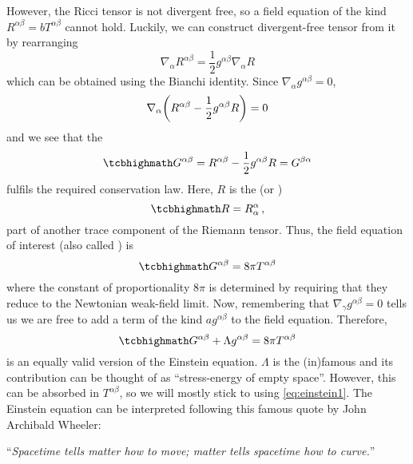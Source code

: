 However, the Ricci tensor is not divergent free, so a field equation of the kind $R^{\alpha \beta} = b T^{\alpha \beta}$ cannot hold. Luckily, we can construct divergent-free tensor from it by rearranging
\begin{equation*}
\nabla_\alpha R^{\alpha \beta} = \frac{1}{2} g^{\alpha \beta} \nabla_\alpha R
\end{equation*}
which can be obtained using the Bianchi identity. Since $\nabla_\alpha g^{\alpha \beta} = 0$,
\begin{equation}
\nabla_\alpha \qty(R^{\alpha \beta} - \frac{1}{2} g^{\alpha \beta} R) = 0
\end{equation}
and we see that the 
\begin{equation}
\eqbox{
G^{\alpha \beta} = R^{\alpha \beta} - \frac{1}{2} g^{\alpha \beta} R = G^{\beta \alpha}
}
\end{equation}
fulfils the required conservation law. Here, $R$ is the  (or )
\begin{equation}
\eqbox{
R = R^\alpha_\alpha
} \, ,
\end{equation}
part of another trace component of the Riemann tensor. Thus, the field equation of interest (also called ) is
\begin{equation}\label{eq:einstein1}
\eqbox{
G^{\alpha \beta} = 8 \pi T^{\alpha \beta}
}
\end{equation}
where the constant of proportionality $8 \pi$ is determined by requiring that they reduce to the Newtonian weak-field limit. Now, remembering that $\nabla_\gamma g^{\alpha \beta} = 0$ tells us we are free to add a term of the kind $a g^{\alpha \beta}$ to the field equation. Therefore,
\begin{equation}\label{eq:einstein2}
\eqbox{
G^{\alpha \beta} + \Lambda g^{\alpha \beta} = 8 \pi T^{\alpha \beta}
}
\end{equation}
is an equally valid version of the Einstein equation. $\Lambda$ is the (in)famous  and its contribution can be thought of as \enquote{stress-energy of empty space}. However, this can be absorbed in $T^{\alpha \beta}$, so we will mostly stick to using \eqref{eq:einstein1}. The Einstein equation can be interpreted following this famous quote by John Archibald Wheeler:
\begin{center}
\enquote{\textit{Spacetime tells matter how to move; matter tells spacetime how to curve.}}
\end{center}

